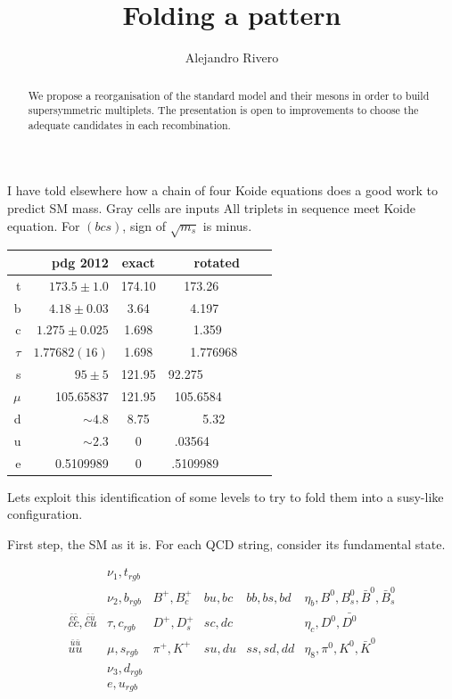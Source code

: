 \documentclass{article}
\begin{document}
\title{Folding a pattern}
\author{Alejandro Rivero}\maketitle
\begin{abstract}
 We propose a reorganisation of the standard model and their mesons in order
 to build supersymmetric multiplets. The presentation is open to improvements
 to choose the adequate candidates in each recombination.
\end{abstract}








I have told elsewhere how a chain of four Koide equations does a good work to predict SM mass.
Gray cells are inputs
All triplets in sequence meet Koide equation. 
For $(bcs)$, sign of $\sqrt {m_s}$ is minus.

\begin{center}
\begin{tabular}{r|r||c|c||}
         &  {pdg 2012}       & {exact} & {rotated}  \\
\hline
t & $173.5 \pm 1.0 $ & \cellcolor[gray]{0.9} 174.10 & 173.26     \\
b & $4.18 \pm 0.03$ & 3.64 &4.197    \\
c & $1.275 \pm 0.025$  & 1.698  &1.359   \\
$\tau$ & $1.77682 (16)$ & 1.698 &1.776968  \\
s & $95 \pm 5$ & 121.95 & 92.275           \\
$\mu$ &105.65837  & 121.95 & \cellcolor[gray]{0.9}105.6584       \\
d &$\sim 4.8$ & 8.75 &  5.32    \\
u &$\sim 2.3$ & \cellcolor[gray]{0.9} 0 & .03564          \\
e &0.5109989 & 0 & \cellcolor[gray]{0.9} .5109989       \\
\hline
\end{tabular}
\end{center}

Lets exploit this identification of some levels to try to fold them into a susy-like configuration.

First step, the SM as it is. For each QCD string, consider its fundamental state.

$$
\begin{array}{lllllll} 
&\nu_1, t_{rgb}&  &   & & \\ 
&\nu_2, b_{rgb}& 
      B^+,B_c^+ & 
      {bu}, {bc}
      & {bb}, {bs}, {bd} & 
      \eta_b, B^0, B^0_s,  \bar B^0, \bar B^0_s \\ 
\stackrel{\bar c\bar c}{cc},\stackrel{\bar c\bar u}{cu}&
\tau, c_{rgb} &
       D^+, D_s^+&
       sc,dc  &
       & 
       \eta_c, D^0, \bar {D^0}\\ 
\stackrel{\bar u\bar u}{uu}&
\mu, s_{rgb} &
         \pi^+, K^+& 
         su, du&
         ss, sd, dd &
         \eta_8, \pi^0, K^0, \bar K^0 \\ 
&\nu_3,  d_{rgb} \\  
&e, u_{rgb}\end{array}
$$
\end{document}
